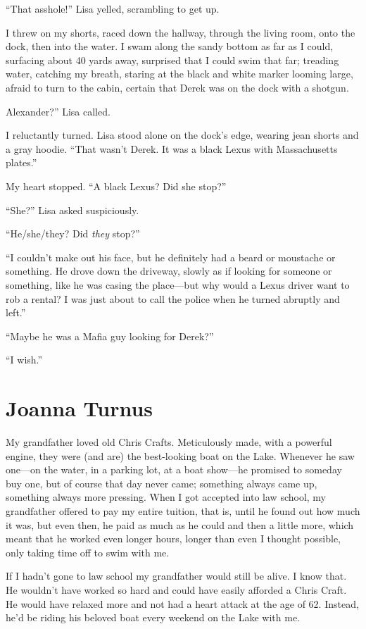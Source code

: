 ``That asshole!'' Lisa yelled, scrambling to get up.

I threw on my shorts, raced down the hallway, through the living room,
onto the dock, then into the water. I swam along the sandy bottom as far
as I could, surfacing about 40 yards away, surprised that I could swim
that far; treading water, catching my breath, staring at the black and
white marker looming large, afraid to turn to the cabin, certain that
Derek was on the dock with a shotgun.

Alexander?'' Lisa called.

I reluctantly turned. Lisa stood alone on the dock's edge, wearing jean
shorts and a gray hoodie. ``That wasn't Derek. It was a black Lexus with
Massachusetts plates.''

My heart stopped. ``A black Lexus? Did she stop?''

``She?'' Lisa asked suspiciously.

``He/she/they? Did \emph{they} stop?''

``I couldn't make out his face, but he definitely had a beard or
moustache or something. He drove down the driveway, slowly as if looking
for someone or something, like he was casing the place---but why would a
Lexus driver want to rob a rental? I was just about to call the police
when he turned abruptly and left.''

``Maybe he was a Mafia guy looking for Derek?''

``I wish.''

\chapter{Joanna Turnus}

\titlemark

My grandfather loved old Chris Crafts. Meticulously made, with a
powerful engine, they were (and are) the best-looking boat on the Lake.
Whenever he saw one---on the water, in a parking lot, at a boat
show---he promised to someday buy one, but of course that day never
came; something always came up, something always more pressing. When I
got accepted into law school, my grandfather offered to pay my entire
tuition, that is, until he found out how much it was, but even then, he
paid as much as he could and then a little more, which meant that he
worked even longer hours, longer than even I thought possible, only
taking time off to swim with me.

If I hadn't gone to law school my grandfather would still be alive. I
know that. He wouldn't have worked so hard and could have easily
afforded a Chris Craft. He would have relaxed more and not had a heart
attack at the age of 62. Instead, he'd be riding his beloved boat every
weekend on the Lake with me.

